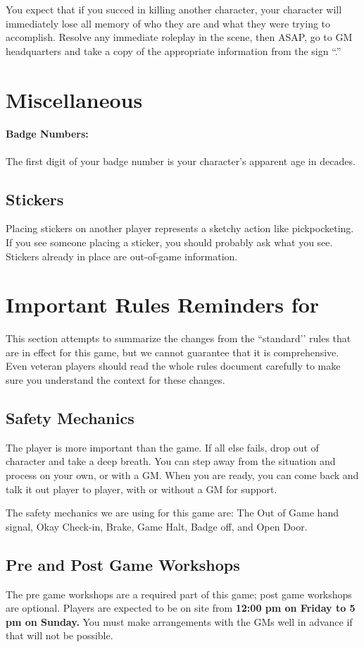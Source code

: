 \documentclass[sheet]{GL2020}
\begin{document}
You expect that if you succed in killing another character, your character will immediately lose all memory of who they are and what they were trying to accomplish. Resolve any immediate roleplay in the scene, then ASAP, go to GM headquarters and take a copy of the appropriate information from the sign ``\sMurderConsequences{}.''

\section{Miscellaneous}

\paragraph{Badge Numbers:} The first digit of your badge number is your character's apparent age in decades.

\subsection{Stickers}
Placing stickers on another player represents a sketchy action like pickpocketing. If you see someone placing a sticker, you should probably ask what you see. Stickers already in place are out-of-game information.

\section{Important Rules Reminders for \gamename}
This section attempts to summarize the changes from the ``standard’’ rules that are in effect for this game, but we cannot guarantee that it is comprehensive. Even veteran players should read the whole rules document carefully to make sure you understand the context for these changes.

\subsection{Safety Mechanics}
The player is more important than the game. If all else fails, drop out of character and take a deep breath. You can step away from the situation and process on your own, or with a GM. When you are ready, you can come back and talk it out player to player, with or without a GM for support.

The safety mechanics we are using for this game are: The Out of Game hand signal, Okay Check-in, Brake, Game Halt, Badge off, and Open Door.

\subsection{Pre and Post Game Workshops}
The pre game workshops are a required part of this game; post game workshops are optional. Players are expected to be on site from \textbf{12:00 pm on Friday to 5 pm on Sunday.} You must make arrangements with the GMs well in advance if that will not be possible.
\end{document}
